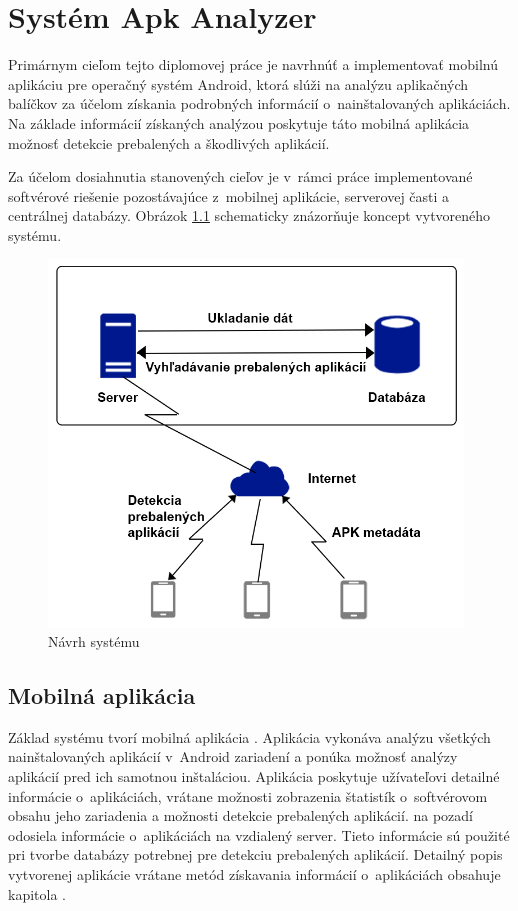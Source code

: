\chapter{Systém Apk Analyzer}
\label{chap:apk-analyzer}

Primárnym cieľom tejto diplomovej práce je navrhnúť a implementovať mobilnú aplikáciu pre operačný systém Android, ktorá slúži na analýzu aplikačných balíčkov za účelom získania podrobných informácií o~nainštalovaných aplikáciách. Na základe informácií získaných analýzou poskytuje táto mobilná aplikácia možnosť detekcie prebalených a škodlivých aplikácií. 

Za účelom dosiahnutia stanovených cieľov je v~rámci práce implementované softvérové riešenie pozostávajúce z~mobilnej aplikácie, serverovej časti a centrálnej databázy. Obrázok \ref{fig:systémApkAnalyzer} schematicky znázorňuje koncept vytvoreného systému.

\begin{figure}[htb]
  \begin{center}
    \includegraphics[width=110mm]{images/system-overview.png}
  \end{center}
  \caption{Návrh systému }
  \label{fig:systémApkAnalyzer}
\end{figure}

\section{Mobilná aplikácia}
Základ systému tvorí mobilná aplikácia . Aplikácia vykonáva analýzu všetkých nainštalovaných aplikácií v~Android zariadení a ponúka možnosť analýzy aplikácií pred ich samotnou inštaláciou. Aplikácia poskytuje užívateľovi detailné informácie o~aplikáciách, vrátane možnosti zobrazenia štatistík o~softvérovom obsahu jeho zariadenia a možnosti detekcie prebalených aplikácií.  na pozadí odosiela informácie o~aplikáciách na vzdialený server. Tieto informácie sú použité pri tvorbe databázy potrebnej pre detekciu prebalených aplikácií. Detailný popis vytvorenej aplikácie vrátane metód získavania informácií o~aplikáciách obsahuje kapitola \label{chap:mobilna-aplikacia}.

